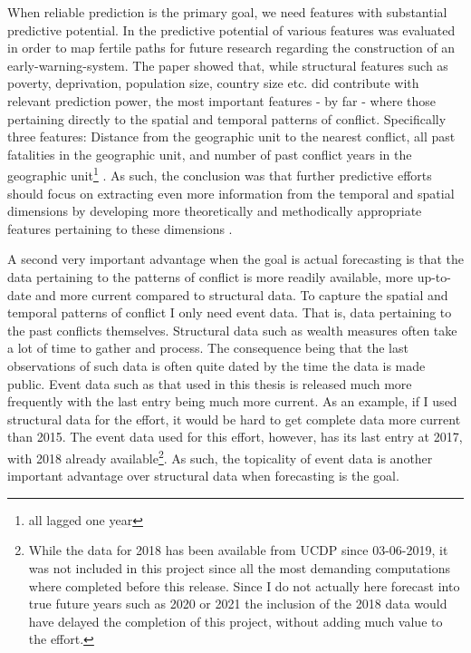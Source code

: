 \documentclass[a4paper]{article}
\begin{document}
When reliable prediction is the primary goal, we need features with substantial predictive potential. In \cite{Maase} the predictive potential of various features was evaluated in order to map fertile paths for future research regarding the construction of an early-warning-system. The paper showed that, while structural features such as poverty, deprivation, population size, country size etc. did contribute with relevant prediction power, the most important features - by far - where those pertaining directly to the spatial and temporal patterns of conflict. Specifically three features: Distance from the geographic unit to the nearest conflict, all past fatalities in the geographic unit, and number of past conflict years in the geographic unit\footnote{all lagged one year} \citep[17-18]{Maase}. As such, the conclusion was that further predictive efforts should focus on extracting even more information from the temporal and spatial dimensions by developing more theoretically and methodically appropriate features pertaining to these dimensions \citep[21-23]{Maase}.\par

A second very important advantage when the goal is actual forecasting is that the data pertaining to the patterns of conflict is more readily available, more up-to-date and more current compared to structural data. To capture the spatial and temporal patterns of conflict I only need event data. That is, data pertaining to the past conflicts themselves. Structural data such as wealth measures often take a lot of time to gather and process. The consequence being that the last observations of such data is often quite dated by the time the data is made public. Event data such as that used in this thesis is released much more frequently with the last entry being much more current. As an example, if I used structural data for the effort, it would be hard to get complete data more current than 2015. The event data used for this effort, however, has its last entry at 2017, with 2018 already available\footnote{While the data for 2018 has been available from UCDP since 03-06-2019, it was not included in this project since all the most demanding computations where completed before this release. Since I do not actually here forecast into true future years such as 2020 or 2021 the inclusion of the 2018 data would have delayed the completion of this project, without adding much value to the effort.}. As such, the topicality of event data is another important advantage over structural data when forecasting is the goal.\par
\end{document}
